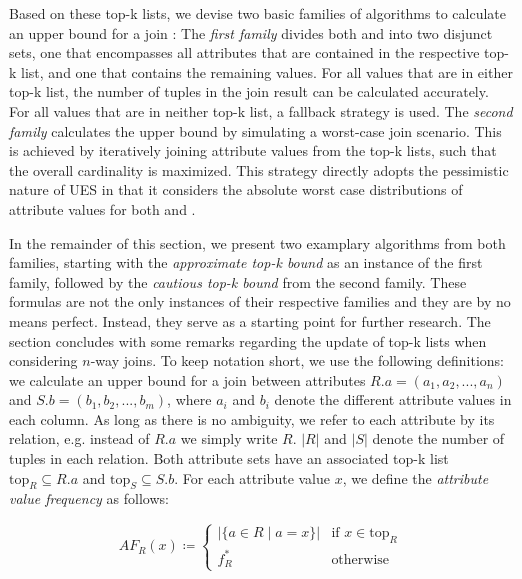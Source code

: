 Based on these top-k lists, we devise two basic families of algorithms to calculate an upper bound for a join : The \emph{first family} divides both  and  into two disjunct sets, one that encompasses all attributes that are contained in the respective top-k list, and one that contains the remaining values. 
For all values that are in either top-k list, the number of tuples in the join result can be calculated accurately. 
For all values that are in neither top-k list, a fallback strategy is used. 
The \emph{second family} calculates the upper bound by simulating a worst-case join scenario. 
This is achieved by iteratively joining attribute values from the top-k lists, such that the overall cardinality is maximized. 
This strategy directly adopts the pessimistic nature of UES in that it considers the absolute worst case distributions of attribute values for both  and .

In the remainder of this section, we present two examplary algorithms from both families, starting with the \emph{approximate top-k bound} as an instance of the first family, followed by the \emph{cautious top-k bound} from the second family. 
These formulas are not the only instances of their respective families and they are by no means perfect. 
Instead, they serve as a starting point for further research. 
The section concludes with some remarks regarding the update of top-k lists when considering $n$-way joins. 
To keep notation short, we use the following definitions: we calculate an upper bound for a join  between attributes $R.a = (a_1, a_2, ..., a_n)$ and $S.b = (b_1, b_2, ..., b_m)$, where $a_i$ and $b_i$ denote the different attribute values in each column.
As long as there is no ambiguity, we refer to each attribute by its relation, e.g. instead of $R.a$ we simply write $R$. 
$|R|$ and $|S|$ denote the number of tuples in each relation. 
Both attribute sets have an associated top-k list $\text{top}_R \subseteq R.a$ and $\text{top}_S \subseteq S.b$. 
For each attribute value $x$, we define the \emph{attribute value frequency} as follows:

\begin{equation*}
    AF_R(x) \coloneqq
    \begin{cases}
    |\{a \in R\;|\;a = x\}| & \text{if $x \in \text{top}_R$} \\
    f^\ast_R & \text{otherwise}
    \end{cases}
\end{equation*}

